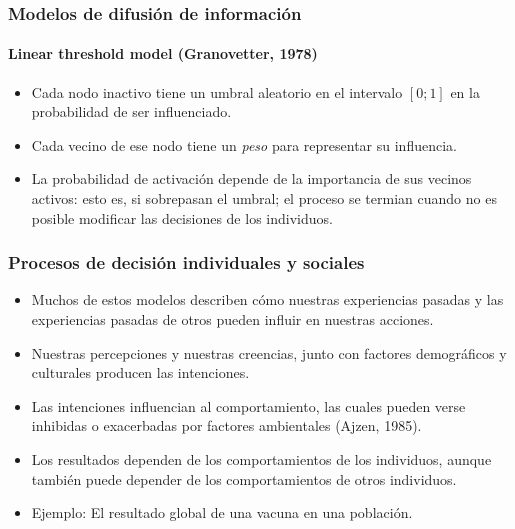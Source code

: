 \documentclass[11pt]{beamer}
\begin{document}
\begin{frame}
	\frametitle{Modelos de difusión de información}
	\framesubtitle{Linear threshold model (Granovetter, 1978)}
		\begin{itemize}
	\item Cada nodo inactivo tiene un umbral aleatorio en el intervalo $[0 ; 1]$ en la probabilidad de ser influenciado.
	\item Cada vecino de ese nodo tiene un \textit{peso} para representar su influencia.
	\item La probabilidad de activación depende de la importancia de sus vecinos activos: esto es, si sobrepasan el umbral; el proceso se termian cuando no es posible modificar las decisiones de los individuos.
\end{itemize}
\end{frame}


\begin{frame}
	\frametitle{Procesos de decisión individuales y sociales}
	\begin{itemize}
		\item Muchos de estos modelos describen cómo nuestras experiencias pasadas y las experiencias pasadas de otros pueden influir en nuestras acciones.
		\item Nuestras percepciones y nuestras creencias, junto con factores demográficos y culturales producen las intenciones.
		\item Las intenciones influencian al comportamiento, las cuales pueden verse inhibidas o exacerbadas por factores ambientales (Ajzen, 1985).
		\item Los resultados dependen de los comportamientos de los individuos, aunque también puede depender de los comportamientos de otros individuos. 
		\item Ejemplo: El resultado global de una vacuna en una población.
	\end{itemize}
\end{frame}
\end{document}
